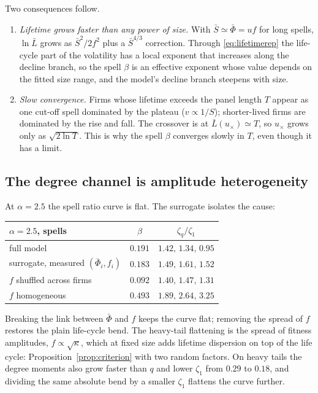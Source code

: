 \documentclass[11pt]{article}
\newcommand{\bPhi}{\bar\Phi}
\begin{document}
Two consequences follow.
\begin{enumerate}
  \item \emph{Lifetime grows faster than any power of size.}  With $\bar S\simeq\bPhi=uf$ for long
        spells, $\ln\bar L$ grows as $\bar S^2/2f^2$ plus a $\bar S^{4/3}$ correction.  Through
        \eqref{eq:lifetimerep} the life-cycle part of the volatility has a local exponent that
        increases along the decline branch, so the spell $\beta$ is an effective exponent whose
        value depends on the fitted size range, and the model's decline branch steepens with size.
  \item \emph{Slow convergence.}  Firms whose lifetime exceeds the panel length $T$ appear as one
        cut-off spell dominated by the plateau ($v\propto1/S$); shorter-lived firms are dominated
        by the rise and fall.  The crossover is at $\bar L(u_\times)\simeq T$, so $u_\times$ grows
        only as $\sqrt{2\ln T}$.  This is why the spell $\beta$ converges slowly in $T$, even
        though it has a limit.
\end{enumerate}

\subsection{The degree channel is amplitude heterogeneity}

At $\alpha=2.5$ the spell ratio curve is flat.  The surrogate isolates the cause:

\begin{center}\small
\begin{tabular}{lcc}
\toprule
$\alpha=2.5$, spells & $\beta$ & $\zeta_q/\zeta_1$\\
\midrule
full model & $0.191$ & $1.42,\,1.34,\,0.95$\\
surrogate, measured $(\bPhi_i,f_i)$ & $0.183$ & $1.49,\,1.61,\,1.52$\\
$f$ shuffled across firms & $0.092$ & $1.40,\,1.47,\,1.31$\\
$f$ homogeneous & $0.493$ & $1.89,\,2.64,\,3.25$\\
\bottomrule
\end{tabular}
\end{center}

\noindent Breaking the link between $\bPhi$ and $f$ keeps the curve flat; removing the spread of
$f$ restores the plain life-cycle bend.  The heavy-tail flattening is the spread of fitness
amplitudes, $f\propto\sqrt\kappa$, which at fixed size adds lifetime dispersion on top of the life
cycle: Proposition~\ref{prop:criterion} with two random factors.  On heavy tails the degree
moments also grow faster than $q$ and lower $\zeta_1$ from $0.29$ to $0.18$, and dividing the
same absolute bend by a smaller $\zeta_1$ flattens the curve further.
\end{document}
